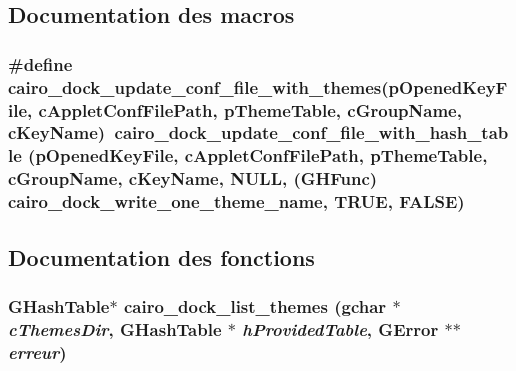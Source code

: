 \subsection{Documentation des macros}
\subsubsection{\setlength{\rightskip}{0pt plus 5cm}\#define cairo\_\-dock\_\-update\_\-conf\_\-file\_\-with\_\-themes(pOpenedKeyFile, cAppletConfFilePath, pThemeTable, cGroupName, cKeyName)~cairo\_\-dock\_\-update\_\-conf\_\-file\_\-with\_\-hash\_\-table (pOpenedKeyFile, cAppletConfFilePath, pThemeTable, cGroupName, cKeyName, NULL, (GHFunc) cairo\_\-dock\_\-write\_\-one\_\-theme\_\-name, TRUE, FALSE)}\label{cairo-dock-themes-manager_8h_7710e8b1d53a9d41c3ce911a528f503d}




\subsection{Documentation des fonctions}
\subsubsection{\setlength{\rightskip}{0pt plus 5cm}GHashTable$\ast$ cairo\_\-dock\_\-list\_\-themes (gchar $\ast$ {\em cThemesDir}, GHashTable $\ast$ {\em hProvidedTable}, GError $\ast$$\ast$ {\em erreur})}\label{cairo-dock-themes-manager_8h_f2b87f4aad180d5e5368088bdb05240b}



